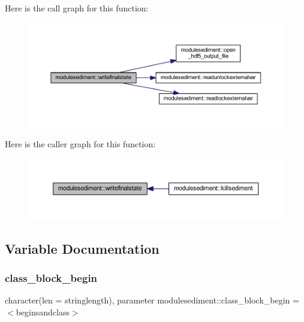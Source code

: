 Here is the call graph for this function\+:\nopagebreak
\begin{figure}[H]
\begin{center}
\leavevmode
\includegraphics[width=350pt]{namespacemodulesediment_a1f674dbab21e666bea43953621c4cce3_cgraph}
\end{center}
\end{figure}
Here is the caller graph for this function\+:\nopagebreak
\begin{figure}[H]
\begin{center}
\leavevmode
\includegraphics[width=350pt]{namespacemodulesediment_a1f674dbab21e666bea43953621c4cce3_icgraph}
\end{center}
\end{figure}


\subsection{Variable Documentation}
\mbox{\label{namespacemodulesediment_af1006e09404ecf1262d3fe43df71f09c}} 
\subsubsection{\texorpdfstring{class\+\_\+block\+\_\+begin}{class\_block\_begin}}
{\footnotesize\ttfamily character(len = stringlength), parameter modulesediment\+::class\+\_\+block\+\_\+begin = \textquotesingle{}$<$beginsandclass$>$\textquotesingle{}\hspace{0.3cm}{\ttfamily [private]}}

